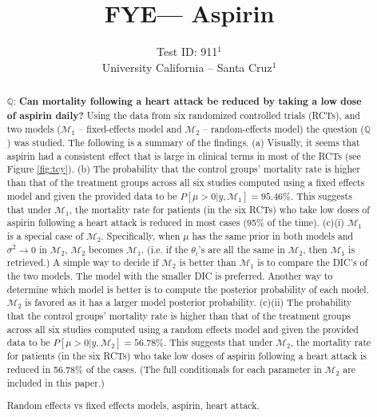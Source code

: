 \documentclass{../../tex_template/asaproc}
\title{FYE--- Aspirin}
\author{
  Test ID: 911$^1$\\
  University California -- Santa Cruz$^1$\\
}
\newcommand{\bk}[1]{\left[#1\right]}
\newcommand{\M}{\mathcal{M}}
\newcommand{\Q}{\mathbb{Q}}
\begin{document}
\maketitle
\begin{abstract}
$\Q$: \textbf{Can mortality following a heart attack be reduced by taking a low
dose of aspirin daily?} Using the data from six randomized controlled trials
(RCTs), and two models ($\M_1$ -- fixed-effects model and $\M_2$ --
random-effects model) the question ($\Q$) was studied. The following is a
summary of the findings. (a) Visually, it seems that aspirin had a consistent
effect that is large in clinical terms in most of the RCTs (see Figure
\ref{fig:tcy}).  (b) The probability that the control groups' mortality rate is
higher than that of the treatment groups across all six studies computed using
a fixed effects model and given the provided data to be $P\bk{\mu > 0 | y, \M_1} =
95.46\%$. This suggests that under $\M_1$, the mortality rate for patients (in
the six RCTs) who take low doses of aspirin following a heart attack is reduced
in most cases (95\% of the time). (c)(i) $\M_1$ is a special case of $\M_2$.
Specifically, when $\mu$ has the same prior in both models and $\sigma^2
\rightarrow 0$ in $\M_2$, $\M_2$ becomes $\M_1$. (i.e. if the $\theta_i$'s are
all the same in $\M_2$, then $\M_1$ is retrieved.) A simple way to decide if
$\M_2$ is better than $\M_1$ is to compare the DIC's of the two models. The
model with the smaller DIC is preferred. Another way to determine which model
is better is to compute the posterior probability of each model.  $\M_2$ is
favored as it has a larger model posterior probability. (c)(ii) The probability
that the control groups' mortality rate is higher than that of the treatment
groups across all six studies computed using a random effects model and given
the provided data to be $P\bk{\mu > 0 | y, \M_2} = 56.78\%$. This suggests that
under $\M_2$, the mortality rate for patients (in the six RCTs) who take low
doses of aspirin following a heart attack is reduced in 56.78\% of the cases.
(The full conditionals for each parameter in $\M_2$ are included in this
paper.)

\begin{keywords}
Random effects vs fixed effects models, aspirin, heart attack.
\end{keywords}
\end{abstract}
\end{document}
